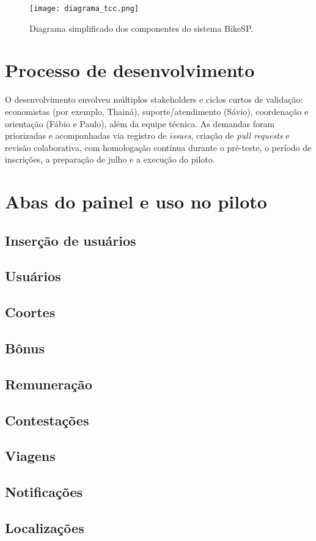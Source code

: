 \begin{figure}[H]
  \centering
  \texttt{[image: diagrama\_tcc.png]}
  \caption{Diagrama simplificado dos componentes do sistema BikeSP.}
  \label{fig:arquitetura}
\end{figure}

\section{Processo de desenvolvimento}
O desenvolvimento envolveu múltiplos stakeholders e ciclos curtos de validação:
economistas (por exemplo, Thainá), suporte/atendimento (Sávio), coordenação e
orientação (Fábio e Paulo), além da equipe técnica. As demandas foram
priorizadas e acompanhadas via registro de \textit{issues}, criação de
\textit{pull requests} e revisão colaborativa, com homologação contínua durante
o pré-teste, o período de inscrições, a preparação de julho e a execução do
piloto.

\section{Abas do painel e uso no piloto}

\subsection{Inserção de usuários}


\subsection{Usuários}



\subsection{Coortes}



\subsection{Bônus}



\subsection{Remuneração}



\subsection{Contestações}



\subsection{Viagens}


\subsection{Notificações}


\subsection{Localizações}


